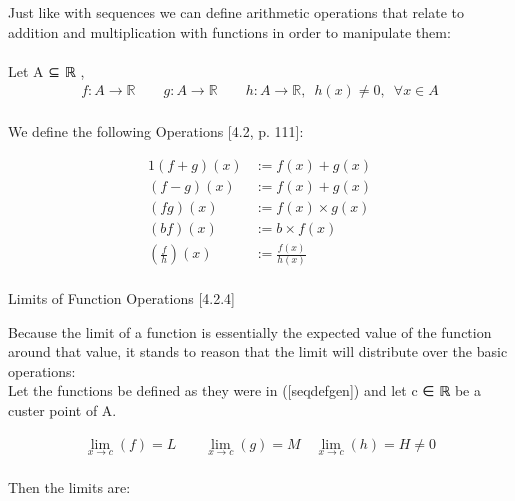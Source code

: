 Just like with sequences we can define arithmetic operations that relate
to addition and multiplication with functions in order to manipulate
them:\\
~\\
Let {A} ⊆ ℝ ,\\
\[\begin{aligned} f: A \rightarrow
\mathbb{R} \qquad g: A
\rightarrow \mathbb{R}
\qquad h: A \rightarrow
\mathbb{R}, \enspace h(x)
\neq 0, \enspace \forall x
\in A
\label{seqdefgen}\end{aligned}\]\\

We define the following Operations {[}4.2, p. 111{]}:

\[\begin{aligned} {1} \left( f+g
\right) \left( x \right)
&:= f\left( x \right) +
g\left( x \right)
\label{addfundef} \\
\left( f-g \right) \left( x
\right) &:= f\left( x
\right) + g\left( x \right)
\label{subfundef} \\
\left( fg \right) \left( x
\right) &:= f\left( x
\right) \times g\left( x
\right) \label{multfundef}
\\ \left( bf
\right) \left( x \right)
&:= b \times f\left( x
\right) \label{confundef}
\\ \left(
\frac{f}{h}
\right)\left( x \right)
&:= \frac{f\left( x
\right)}{h\left( x
\right)} \end{aligned}\]\\

Limits of Function Operations {[}4.2.4{]}

Because the limit of a function is essentially the expected value of the
function around that value, it stands to reason that the limit will
distribute over the basic operations:\\
Let the functions be defined as they were in ({[}seqdefgen{]}) and let
{c} ∈ ℝ be a custer point of {A}.

\[\begin{aligned} \lim_{x
\rightarrow c}\left( f
\right) = L \qquad
\lim_{x \rightarrow
c}\left( g \right) = M
\quad \lim_{x\rightarrow
c}\left( h \right) = H
\neq 0
\label{fundeflim}\end{aligned}\]\\

Then the limits are:


